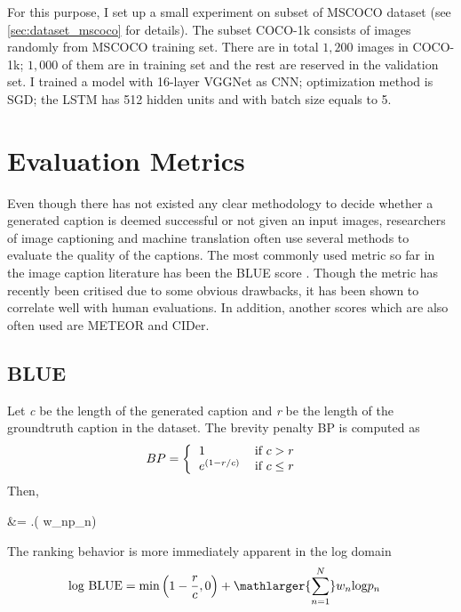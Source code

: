 	For this purpose, I set up a small experiment on subset of MSCOCO dataset (see \ref{sec:dataset_mscoco} for details). The subset COCO-1k consists of images randomly from MSCOCO training set. There are in total $1,200$ images in COCO-1k; $1,000$ of them are in training set and the rest are reserved in the validation set. I trained a model with 16-layer VGGNet as CNN; optimization method is SGD; the LSTM has 512 hidden units and with batch size equals to 5.
\section{Evaluation Metrics}
\label{sec:chap4_metric}
Even though there has not existed any clear methodology to decide whether a generated caption is deemed successful or not given an input images, researchers of image captioning and machine translation often use several methods to evaluate the quality of the captions. The most commonly used metric so far in the image caption literature has been the BLUE score \cite{Papineni:2002:BMA:1073083.1073135}. Though the metric has recently been critised due to some obvious drawbacks, it has been shown to correlate well with human evaluations. In addition, another scores which are also often used are METEOR and CIDer.

\subsection{BLUE}
Let \textit{c} be the length of the generated caption and \textit{r} be the length of the groundtruth caption in the dataset. The brevity penalty BP is computed as
\begin{align}
	BP &= \left\{
		\begin{tabular}{l l}
			1 & if $c > r$ \\
			$e^{\left(1 - r/c\right)}$ & if $c \leq r$
		\end{tabular}
	\right.
\end{align}
Then,
	\begin{tcolorbox}[ams align, colback=yellow!10!white,colframe=bordeuxcolor]
		\centering
		 &= .\left( w_np_n\right) 
	\end{tcolorbox}
The ranking behavior is more immediately apparent in the log domain
\begin{align*}
	\text{log BLUE} &= \text{min} \left(1 - \frac{r}{c}, 0\right) + \mathlarger{\sum^N_{n=1}} w_n\text{log}p_n 
\end{align*}


